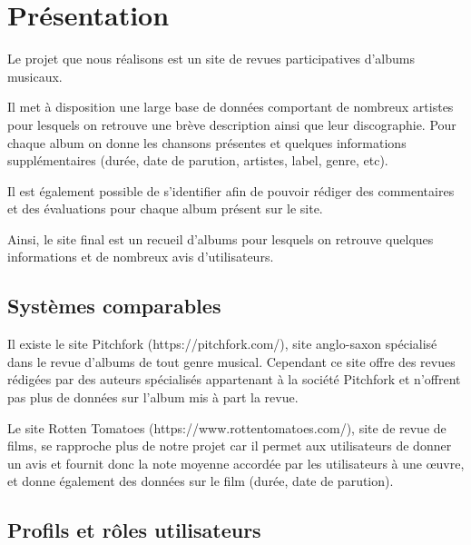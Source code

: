 \section{Présentation}

  \begin{paragraphe}
  	Le projet que nous réalisons est un site de revues participatives d’albums
    musicaux.\par
    Il met à disposition une large base de données comportant de nombreux artistes
    pour lesquels on retrouve une brève description ainsi que leur discographie.
    Pour chaque album on donne les chansons présentes et quelques informations
    supplémentaires (durée, date de parution, artistes, label, genre, etc). \par
    Il est également possible de s’identifier afin de pouvoir rédiger des
    commentaires et des évaluations pour chaque album présent sur le site.
  \end{paragraphe}

  \begin{paragraphe}
    Ainsi, le site final est un recueil d’albums pour lesquels on retrouve
    quelques informations et de nombreux avis d’utilisateurs.
  \end{paragraphe}

  \subsection{Systèmes comparables}

  \begin{paragraphe}
    Il existe le site Pitchfork (https://pitchfork.com/), site anglo-saxon
    spécialisé dans le revue d’albums de tout genre musical. Cependant ce site
    offre des revues rédigées par des auteurs spécialisés appartenant à la
    société Pitchfork et n’offrent pas plus de données sur l’album mis à part
    la revue.\par
    Le site Rotten Tomatoes (https://www.rottentomatoes.com/), site de revue de
    films, se rapproche plus de notre projet car il permet aux utilisateurs de
    donner un avis et fournit donc la note moyenne accordée par les
    utilisateurs à une œuvre, et donne également des données sur le film
    (durée, date de parution).
  \end{paragraphe}

  \subsection{Profils et rôles utilisateurs}

